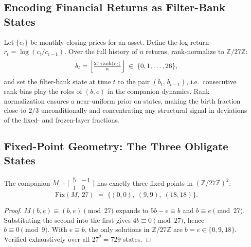 \subsection{Encoding Financial Returns as Filter-Bank States}
\label{sec:encoding}

Let $\{c_t\}$ be monthly closing prices for an asset.  Define the
log-return $r_t = \log(c_t / c_{t-1})$.  Over the full history of $n$
returns, rank-normalize to $\mathbb{Z}/27\mathbb{Z}$:
\[
  b_t = \Bigl\lfloor \tfrac{27 \cdot \mathrm{rank}(r_t)}{n} \Bigr\rfloor
  \;\in\; \{0,1,\ldots,26\},
\]
and set the filter-bank state at time $t$ to the pair $(b_t,\, b_{t-1})$,
i.e.\ consecutive rank bins play the roles of $(b, e)$ in the companion
dynamics.  Rank normalization ensures a near-uniform prior on states,
making the birth fraction close to $2/3$ unconditionally and concentrating
any structural signal in deviations of the fixed- and frozen-layer fractions.

\subsection{Fixed-Point Geometry: The Three Obligate States}
\label{sec:fixed-geometry}

\begin{theorem}
\label{thm:fixed-locus}
The companion $M = \bigl[\begin{smallmatrix}5 & -1\\ 1 & 0\end{smallmatrix}
\bigr]$ has exactly three fixed points in $(\mathbb{Z}/27\mathbb{Z})^2$:
\[
  \mathrm{Fix}(M,\,27) \;=\; \{(0,0),\;(9,9),\;(18,18)\}.
\]
\end{theorem}

\begin{proof}
$M(b,e) \equiv (b,e) \pmod{27}$ expands to $5b - e \equiv b$ and
$b \equiv e \pmod{27}$.  Substituting the second into the first gives
$4b \equiv 0 \pmod{27}$, hence $b \equiv 0 \pmod{9}$.  With $e \equiv b$,
the only solutions in $\mathbb{Z}/27\mathbb{Z}$ are $b = e \in \{0,9,18\}$.
Verified exhaustively over all $27^2 = 729$ states.
\end{proof}

